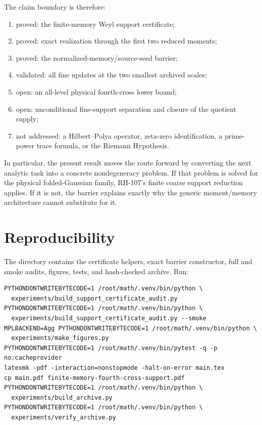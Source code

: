 \documentclass[11pt]{article}
\theoremstyle{definition}
\theoremstyle{remark}
\begin{document}
The claim boundary is therefore:
\begin{enumerate}[leftmargin=2.2em]
 \item proved: the finite-memory Weyl support certificate;
 \item proved: exact realization through the first two reduced moments;
 \item proved: the normalized-memory/source-seed barrier;
 \item validated: all fine updates at the two smallest archived scales;
 \item open: an all-level physical fourth-cross lower bound;
 \item open: unconditional fine-support separation and closure of the
       quotient supply;
 \item not addressed: a Hilbert--Polya operator, zeta-zero identification,
       a prime-power trace formula, or the Riemann Hypothesis.
\end{enumerate}

In particular, the present result moves the route forward by converting the
next analytic task into a concrete nondegeneracy problem.  If that problem
is solved for the physical folded-Gaussian family, RH-107's finite coarse
support reduction applies.  If it is not, the barrier explains exactly why
the generic moment/memory architecture cannot substitute for it.

\section{Reproducibility}

The directory contains the certificate helpers, exact barrier constructor,
full and smoke audits, figures, tests, and hash-checked archive.  Run:
\begin{verbatim}
PYTHONDONTWRITEBYTECODE=1 /root/math/.venv/bin/python \
  experiments/build_support_certificate_audit.py
PYTHONDONTWRITEBYTECODE=1 /root/math/.venv/bin/python \
  experiments/build_support_certificate_audit.py --smoke
MPLBACKEND=Agg PYTHONDONTWRITEBYTECODE=1 /root/math/.venv/bin/python \
  experiments/make_figures.py
PYTHONDONTWRITEBYTECODE=1 /root/math/.venv/bin/pytest -q -p no:cacheprovider
latexmk -pdf -interaction=nonstopmode -halt-on-error main.tex
cp main.pdf finite-memory-fourth-cross-support.pdf
PYTHONDONTWRITEBYTECODE=1 /root/math/.venv/bin/python \
  experiments/build_archive.py
PYTHONDONTWRITEBYTECODE=1 /root/math/.venv/bin/python \
  experiments/verify_archive.py
\end{verbatim}



\end{document}
